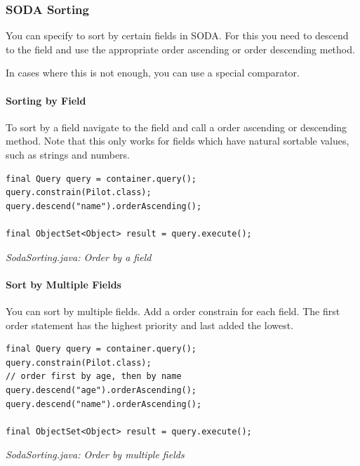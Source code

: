 \subsubsection{SODA Sorting}
\label{ref:basics-querying-soda-soda-sorting}

You can specify to sort by certain fields in SODA. For this you need to descend to the field and use the appropriate order ascending or order descending method.

In cases where this is not enough, you can use a special comparator.

\paragraph{Sorting by Field}
\label{ref:basics-querying-soda-soda-sorting:sortbyfield}

To sort by a field navigate to the field and call a order ascending or descending method. Note that this only works for fields which have natural sortable values, such as strings and numbers.

\begin{lstlisting}
final Query query = container.query();
query.constrain(Pilot.class);
query.descend("name").orderAscending();

final ObjectSet<Object> result = query.execute();
\end{lstlisting}

{\small\itshape SodaSorting.java: Order by a field\par}
\medskip

\paragraph{Sort by Multiple Fields}
\label{ref:basics-querying-soda-soda-sorting:sortbymultiplefields}

You can sort by multiple fields. Add a order constrain for each field. The first order statement has the highest priority and last added the lowest.

\begin{lstlisting}
final Query query = container.query();
query.constrain(Pilot.class);
// order first by age, then by name
query.descend("age").orderAscending();
query.descend("name").orderAscending();

final ObjectSet<Object> result = query.execute();
\end{lstlisting}

{\small\itshape SodaSorting.java: Order by multiple fields\par}
\medskip

